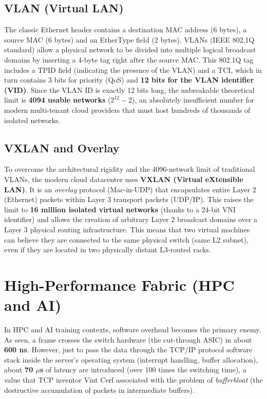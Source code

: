 \subsection{VLAN (Virtual LAN)}
The classic Ethernet header contains a destination MAC address (6 bytes), a source MAC (6 bytes) and an EtherType field (2 bytes). VLANs (IEEE 802.1Q standard) allow a physical network to be divided into multiple logical broadcast domains by inserting a 4-byte tag right after the source MAC. 
This 802.1Q tag includes a TPID field (indicating the presence of the VLAN) and a TCI, which in turn contains 3 bits for priority (QoS) and \textbf{12 bits for the VLAN identifier (VID)}. Since the VLAN ID is exactly 12 bits long, the unbreakable theoretical limit is \textbf{4094 usable networks} ($2^{12}-2$), an absolutely insufficient number for modern multi-tenant cloud providers that must host hundreds of thousands of isolated networks.

\subsection{VXLAN and Overlay}
To overcome the architectural rigidity and the 4096-network limit of traditional VLANs, the modern cloud datacenter uses \textbf{VXLAN (Virtual eXtensible LAN)}. It is an \textit{overlay} protocol (Mac-in-UDP) that encapsulates entire Layer 2 (Ethernet) packets within Layer 3 transport packets (UDP/IP). 
This raises the limit to \textbf{16 million isolated virtual networks} (thanks to a 24-bit VNI identifier) and allows the creation of arbitrary Layer 2 broadcast domains over a Layer 3 physical routing infrastructure. This means that two virtual machines can believe they are connected to the same physical switch (same L2 subnet), even if they are located in two physically distant L3-routed racks.

\section{High-Performance Fabric (HPC and AI)}
In HPC and AI training contexts, software overhead becomes the primary enemy. As seen, a frame crosses the switch hardware (the cut-through ASIC) in about \textbf{600 ns}. However, just to pass the data through the TCP/IP protocol software stack inside the server's operating system (interrupt handling, buffer allocation), about \textbf{70 $\mu$s} of latency are introduced (over 100 times the switching time), a value that TCP inventor Vint Cerf associated with the problem of \textit{bufferbloat} (the destructive accumulation of packets in intermediate buffers).

